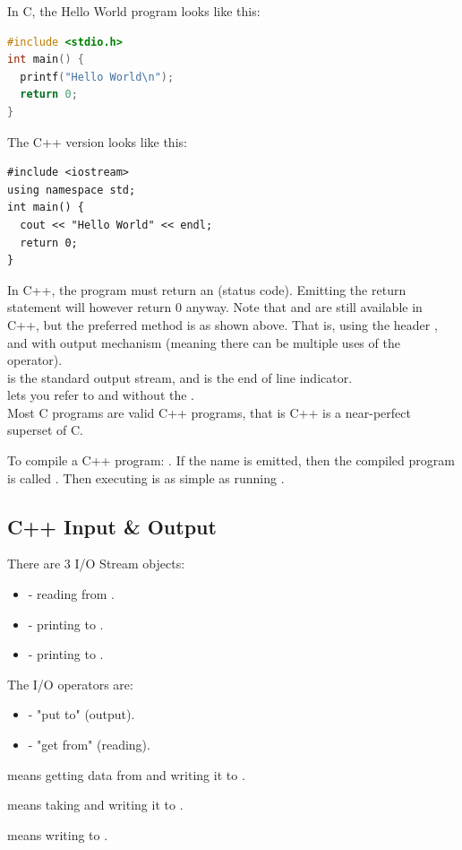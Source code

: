 \documentclass[english, 11pt]{article}
\begin{document}
    In C, the Hello World program looks like this:
    \begin{lstlisting}[language=c]
#include <stdio.h>
int main() {
  printf("Hello World\n");
  return 0;
}
    \end{lstlisting}
    The C++ version looks like this:
\begin{lstlisting}
#include <iostream>
using namespace std;
int main() {
  cout << "Hello World" << endl;
  return 0;
}
\end{lstlisting}
\begin{note}
  In C++, the  program must return an  (status code). Emitting the return statement will however return 0 anyway. Note that  and  are still available in C++, but the preferred method is as shown above. That is, using the header , and with output mechanism  (meaning there can be multiple uses of the \tc{<<} operator). \\
   is the standard output stream, and  is the end of line indicator. \\
   lets you refer to  and  without the . \\

  Most C programs are valid C++ programs, that is C++ is a near-perfect superset of C.
\end{note}

To compile a C++ program:  . If the name is emitted, then the compiled program is called . Then executing is as simple as running .

\subsection{C++ Input \& Output}

There are 3 I/O Stream objects:
\begin{itemize}
  \item {} - reading from .
  \item {} - printing to .
  \item {} - printing to .
\end{itemize}
The I/O operators are:
\begin{itemize}
  \item \tc{<<} - "put to" (output).
  \item \tc{>>} - "get from" (reading).
\end{itemize}
\begin{exmp}
  \item {} means getting data from  and writing it to .
  \item {} means taking  and writing it to .
  \item {} means writing  to .
\end{exmp}
\end{document}
